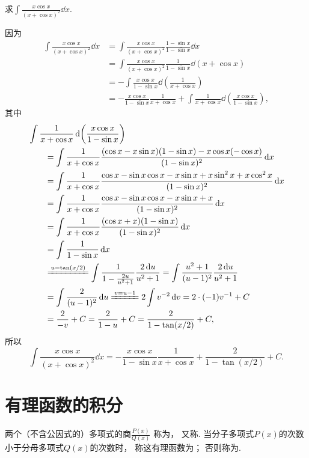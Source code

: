 \begin{example}
求\(\displaystyle\int \frac{x \cos x}{(x + \cos x)^2}\dd{x}\).
\begin{solution}
因为\begin{align*}
\int \frac{x \cos x}{(x + \cos x)^2}\dd{x}
&= \int \frac{x \cos x}{(x + \cos x)^2} \frac{1 - \sin x}{1 - \sin x}\dd{x} \\
&= \int \frac{x \cos x}{(x + \cos x)^2} \frac{1}{1 - \sin x} \dd(x + \cos x) \\
&= -\int \frac{x \cos x}{1 - \sin x} \dd(\frac{1}{x + \cos x}) \\
&= -\frac{x \cos x}{1 - \sin x} \frac{1}{x + \cos x}
	+\int \frac{1}{x + \cos x} \dd(\frac{x \cos x}{1 - \sin x}),
\end{align*}
其中
\begin{align*}
&\int \frac{1}{x + \cos x} \dd(\frac{x \cos x}{1 - \sin x}) \\
&\qquad= \int \frac{1}{x + \cos x}
	\frac{(\cos x  - x \sin x)(1 - \sin x) - x \cos x (-\cos x)}{(1 - \sin x)^2}\dd{x} \\
&\qquad= \int \frac{1}{x + \cos x}
	\frac{\cos x - \sin x \cos x - x \sin x + x \sin^2 x + x \cos^2 x}{(1 - \sin x)^2}\dd{x} \\
&\qquad= \int \frac{1}{x + \cos x}
	\frac{\cos x - \sin x \cos x - x \sin x + x}{(1 - \sin x)^2}\dd{x} \\
&\qquad= \int \frac{1}{x + \cos x}
	\frac{(\cos x + x)(1 - \sin x)}{(1 - \sin x)^2}\dd{x} \\
&\qquad= \int \frac{1}{1 - \sin x}\dd{x} \\
&\qquad\xlongequal{u=\tan(x/2)}
	\int \frac{1}{1 - \frac{2u}{u^2 + 1}} \frac{2\dd{u}}{u^2 + 1}
= \int \frac{u^2 + 1}{(u - 1)^2} \frac{2\dd{u}}{u^2 + 1} \\
&\qquad= \int \frac{2}{(u - 1)^2}\dd{u}
\xlongequal{v=u-1} 2 \int v^{-2}\dd{v}
= 2 \cdot (-1) v^{-1} + C \\
&\qquad= \frac{2}{-v} + C
= \frac{2}{1 - u} + C
= \frac{2}{1 - \tan(x/2)} + C,
\end{align*}
所以\[
\int \frac{x \cos x}{(x + \cos x)^2}\dd{x}
= -\frac{x \cos x}{1 - \sin x} \frac{1}{x + \cos x}
	+\frac{2}{1 - \tan(x/2)} + C.
\]
\end{solution}
\end{example}

\section{有理函数的积分}
两个（不含公因式的）多项式的商\(\frac{P(x)}{Q(x)}\)
称为，
又称.
当分子多项式\(P(x)\)的次数小于分母多项式\(Q(x)\)的次数时，
称这有理函数为；
否则称为.


